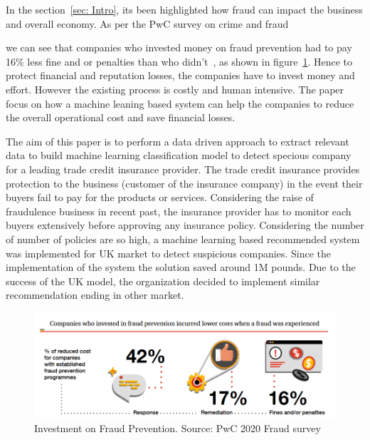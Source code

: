 

In the section~\ref{sec: Intro}, its been highlighted how fraud can impact the business and overall economy. As per the PwC survey on crime and fraud~\caption{1} we can see that companies who invested money on fraud prevention had to pay 16\% less fine and\/ or penalties than who didn't~, as shown in figure~\ref{fig:fraud_preven}. Hence to protect financial and reputation losses, the companies have to invest money and effort. However the existing process is costly and human intensive. The paper focus on how a machine leaning based system can help the companies to reduce the overall operational cost and save financial losses.

The aim of this paper is to perform a data driven approach to extract relevant data to build machine learning classification model to detect specious company for a leading trade credit insurance provider. The trade credit insurance provides protection to the business (customer of the insurance company) in the event their buyers fail to pay for the products or services. Considering the raise of fraudulence business in recent past, the insurance provider has to monitor each buyers extensively before approving any insurance policy. Considering the number of number of policies are so high, a machine learning based recommended system was implemented for UK market to detect suspicious companies. Since the implementation of the system the solution saved around 1M pounds. Due to the success of the UK model, the organization decided to implement similar recommendation ending in other market.

\begin{figure}[htp]
    \centering
    \includegraphics[width=\linewidth]{figures/prevent_fraud.PNG}
    \caption{Investment on Fraud Prevention. Source: PwC 2020 Fraud survey~\cite{PwC.Crime.Survey} }
    \label{fig:fraud_preven}
\end{figure}

